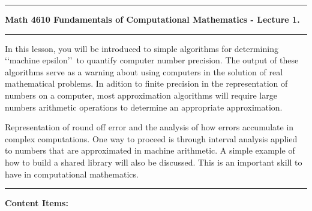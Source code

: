 \documentclass[10pt,fleqn]{article}
\begin{document}
\vskip0.1in\hrule\vskip0.1in
\noindent
{\bf Math 4610 Fundamentals of Computational Mathematics  - Lecture 1.} 
\vskip0.1in\hrule\vskip0.1in
\noindent
In this lesson, you will be introduced to simple algorithms for determining
\lq\lq machine epsilon\rq\rq\ to quantify computer number precision. The output
of these algorithms serve as a warning about using computers in the solution of
real mathematical problems. In adition to finite precision in the representation
of numbers on a computer, most approximation algorithms will require large
numbers arithmetic operations to determine an appropriate approximation.

Representation of round off error and the analysis of how errors accumulate in
complex computations. One way to proceed is through interval analysis applied to
numbers that are approximated in machine arithmetic. A simple 
example of how to build a shared library will also be discussed. This is an
important skill to have in computational mathematics.
\vskip0.1in\hrule\vskip0.1in
\noindent
{\bf Content Items:}
\end{document}
